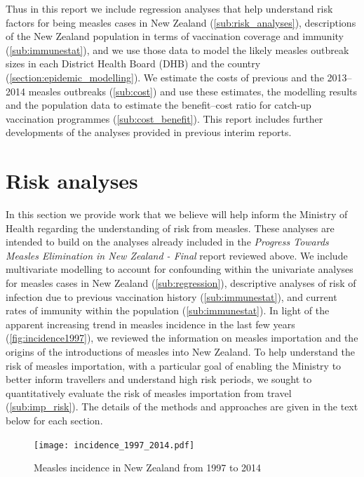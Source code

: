\documentclass{article}
\begin{document}
Thus in this report we include regression analyses that help understand risk factors for being measles cases in New Zealand (\autoref{sub:risk_analyses}), descriptions of the New Zealand population in terms of vaccination coverage and immunity (\autoref{sub:immunestat}), and we use those data to model the likely measles outbreak sizes in each District Health Board (DHB) and the country (\autoref{section:epidemic_modelling}). We estimate the costs of previous and the 2013--2014 measles outbreaks (\autoref{sub:cost}) and use these estimates, the modelling results and the population data to estimate the benefit--cost ratio for catch-up vaccination programmes (\autoref{sub:cost_benefit}). This report includes further developments of the analyses provided in previous interim reports.

\section{Risk analyses}
\label{sub:risk_analyses}

In this section we provide work that we believe will help inform the Ministry of Health regarding the understanding of risk from measles. These analyses are intended to build on the analyses already included in the \emph {Progress Towards Measles Elimination in New Zealand - Final} report reviewed above. We include multivariate modelling to account for confounding within the univariate analyses for measles cases in New Zealand (\autoref{sub:regression}), descriptive analyses of risk of infection due to previous vaccination history (\autoref{sub:immunestat}), and current rates of immunity within the population (\autoref{sub:immunestat}). In light of the apparent increasing trend in measles incidence in the last few years (\autoref{fig:incidence1997}), we reviewed the information on measles importation and the origins of the introductions of measles into New Zealand. To help understand the risk of measles importation, with a particular goal of enabling the Ministry to better inform travellers and understand high risk periods, we sought to quantitatively evaluate the risk of measles importation from travel (\autoref{sub:imp_risk}). The details of the methods and approaches are given in the text below for each section.

\begin{figure}
     \texttt{[image: incidence\_1997\_2014.pdf]}
     \caption{Measles incidence in New Zealand from 1997 to 2014}
     \label{fig:incidence1997}
\end{figure}
\end{document}
